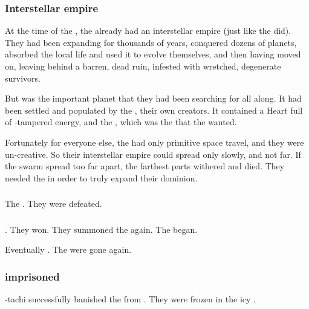 \subsubsection{Interstellar empire}
At the time of the \firstbanewar, the \banes already had an interstellar empire (just like the \ophidians did). 
They had been expanding for thousands of years, conquered dozens of planets, absorbed the local life and used it to evolve themselves, and then having moved on, leaving behind a barren, dead ruin, infested with wretched, degenerate survivors. 

But \Miith was the important planet that they had been searching for all along. 
It had been settled and populated by the \voyagers, their own creators. 
It contained a Heart full of \voyager-tampered energy, and the  , which was the  that the \banes wanted. 

Fortunately for everyone else, the \banes had only primitive space travel, and they were un-creative.
So their interstellar empire could spread only slowly, and not far.
If the \bane swarm spread too far apart, the farthest parts withered and died.
They needed the \noggyal {} in order to truly expand their dominion. 





\subsubsection{\Firstbanewar}
The \banes{} . 
They were defeated. 





\subsubsection{\Secondbanewar}
. 
They won.
They summoned the \banes{} again. 
The  began. 

Eventually . 
The \banelords{} were gone again. 





\subsubsection{\Banelords{} imprisoned}
\index{\CrystalSphere}%
\Tiamat-tachi successfully banished the \banelords{} from \Miith{}. 
They were frozen in the icy . 


